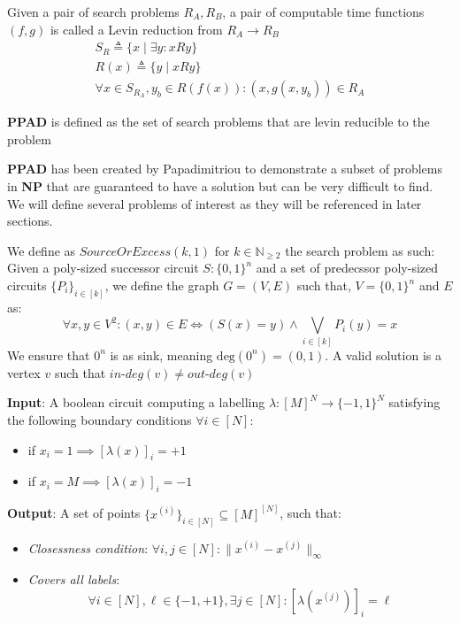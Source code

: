 \begin{definition}
    Given a pair of search problems $R_A, R_B$, a pair of
    computable time functions $(f,g)$ is called a Levin reduction from $R_A \to R_B$
    \begin{gather*}
        S_R \triangleq \{x \mid \exists y : xRy  \}\\
        R(x) \triangleq \{y \mid x Ry \} \\
        \forall x \in S_{R_A}, y_b \in R(f(x)):  (x , g(x, y_b)) \in R_A
    \end{gather*}
\end{definition}

\begin{definition}
    \textbf{PPAD} is defined as the set of search problems that
    are levin reducible to the  problem
\end{definition}


\textbf{PPAD} has been created by Papadimitriou \cite{papadimitriouComplexityParityArgument1994}
to demonstrate a subset of problems in \textbf{NP} that are guaranteed to have
a solution but can be very difficult to find. We will define
several problems of interest as they will be referenced in later sections.

\begin{definition}
    We define as $\textit{SourceOrExcess}(k,1)$ for $k \in \mathbb{N}_{\geq 2}$
    the search problem as such: Given a poly-sized successor circuit $S : \{0,1\}^n$
    and a set of predecssor poly-sized circuits $\{P_i\}_{i \in [k]}$, we define
    the graph $G = (V,E)$ such that, $V = \{0,1\}^n$ and $E$ as:
    $$
    \forall x, y \in V^2: (x,y) \in E \iff (S(x) = y) \wedge \bigvee_{i \in [k]} P_i(y) = x
    $$
    We ensure that $0^n$ is as sink, meaning $\text{deg}(0^n) = (0,1)$.
    A valid solution is a vertex $v$ such that $\textit{in-deg}(v) \neq \textit{out-deg}(v)$
\end{definition}



\begin{definition}
    \textbf{Input}: A boolean circuit computing a labelling $\lambda: [M]^N \to \{-1, 1\}^N$
    satisfying the following boundary conditions $\forall i \in [N]$:
    \begin{itemize}
        \item if $x_i = 1 \implies [\lambda(x)]_i = +1$
        \item if $x_i = M \implies [\lambda(x)]_i = -1$
    \end{itemize}
    \textbf{Output}: A set of points $\{x^{(i)}\}_{i \in [N]} \subseteq [M]^{[N]}$, such that:
    \begin{itemize}
        \item \textit{Closessness condition}: $\forall i,j \in [N]: \|x^{(i)} - x^{(j)}\|_{\infty}$
        \item \textit{Covers all labels}:
            $$
            \forall i \in [N], \ell \in \{-1, +1\}, \exists j \in [N]: [\lambda(x^{(j)})]_{i} = \ell
            $$
    \end{itemize}
\end{definition}


